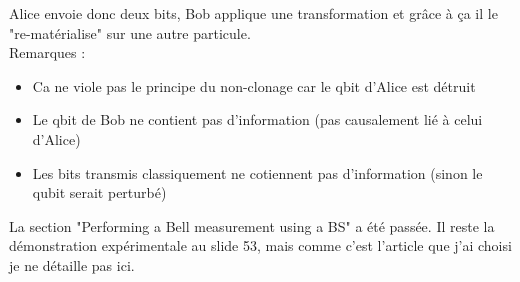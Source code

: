 Alice envoie donc deux bits, Bob applique une transformation et grâce à ça il le "re-matérialise" 
sur une autre particule.\\

Remarques :
\begin{itemize}
\item Ca ne viole pas le principe du non-clonage car le qbit d'Alice est détruit
\item Le qbit de Bob ne contient pas d'information (pas causalement lié à celui d'Alice)
\item Les bits transmis classiquement ne cotiennent pas d'information (sinon le qubit serait
perturbé)
\end{itemize}

La section "Performing a Bell measurement using a BS" a été passée. Il reste la démonstration
expérimentale au slide 53, mais comme c'est l'article que j'ai choisi je ne détaille pas ici.

